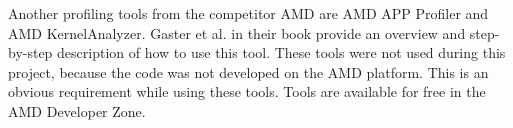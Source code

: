 Another profiling tools from the competitor AMD are AMD APP Profiler and AMD KernelAnalyzer. Gaster et al. in their book\cite{gaster2011heterogeneous} provide an overview and step-by-step description of how to use this tool. These tools were not used during this project, because the code was not developed on the AMD platform. This is an obvious requirement while using these tools. Tools are available for free in the AMD Developer Zone.


